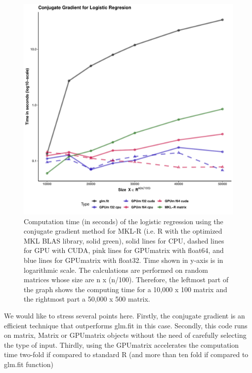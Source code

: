 \begin{figure}
\includegraphics[width=1\linewidth,height=0.5\textheight]{figures/LRGC_glm} \caption{Computation time (in seconds) of the logistic regression using the conjugate gradient method for MKL-R (i.e. R with the optimized MKL BLAS library, solid green), solid lines for CPU, dashed lines for GPU with CUDA, pink lines for GPUmatrix with float64, and blue lines for GPUmatrix with float32. Time shown in y-axis is in logarithmic scale. The calculations are performed on random matrices whose size are n x (n/100). Therefore, the leftmost part of the graph shows the computing time for a 10,000 x 100 matrix and the rightmost part a 50,000 x 500 matrix.}\label{fig:LRGC}
\end{figure}

We would like to stress several points here. Firstly, the conjugate gradient is an efficient technique that outperforms glm.fit in this case. Secondly, this code runs on matrix, Matrix or GPUmatrix objects without the need of carefully selecting the type of input. Thirdly, using the GPUmatrix accelerates the computation time two-fold if compared to standard R (and more than ten fold if compared to glm.fit function)

